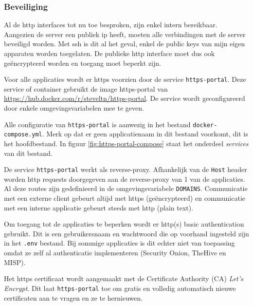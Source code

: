 \documentclass[a4paper,12pt]{report}
\begin{document}
\subsubsection{Beveiliging}
Al de http interfaces tot nu toe besproken, zijn enkel intern bereikbaar.
Aangezien de server een publiek ip heeft, moeten alle verbindingen met de server beveiligd worden.
Met ssh is dit al het geval, enkel de public keys van mijn eigen apparaten worden toegelaten.
De publieke http interface moet dus ook geëncrypteerd worden en toegang moet beperkt zijn.

Voor alle applicaties wordt er https voorzien door de service \lstinline|https-portal|.
Deze service of container gebruikt de image https-portal van \url{https://hub.docker.com/r/steveltn/https-portal}.
De service wordt geconfigureerd door enkele omgevingsvariabelen mee te geven.

Alle configuratie van \lstinline|https-portal| is aanwezig in het bestand \lstinline|docker-compose.yml|.
Merk op dat er geen applicatienaam in dit bestand voorkomt, dit is het hoofdbestand.
In figuur \ref{fig:https-portal-compose} staat het onderdeel \emph{services} van dit bestand.

De service \lstinline|https-portal| werkt als reverse-proxy.
Afhankelijk van de \lstinline|Host| header worden http requests doorgegeven aan de reverse-proxy van 1 van de applicaties.
Al deze routes zijn gedefinieerd in de omgevingsvariabele \lstinline|DOMAINS|.
Communicatie met een externe client gebeurt altijd met https (geëncrypteerd) en communicatie met een interne applicatie gebeurt steeds met http (plain text).

Om toegang tot de applicaties te beperken wordt er http(s) basic authentication gebruikt.
Dit is een gebruikersnaam en wachtwoord die op voorhand ingesteld zijn in het \lstinline|.env| bestand.
Bij sommige applicaties is dit echter niet van toepassing omdat ze zelf al authenticatie implementeren (Security Onion, TheHive en MISP).

Het https certificaat wordt aangemaakt met de Certificate Authority (CA) \emph{Let's Encrypt}.
Dit laat \lstinline|https-portal| toe om gratis en volledig automatisch nieuwe certificaten aan te vragen en ze te hernieuwen.
\end{document}
